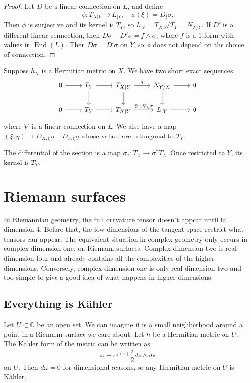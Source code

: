 \documentclass[10pt,a4paper]{article}
\newtheorem*{proof}{Proof}
\newcommand{\kk}[1]{\mathbb{#1}}
\DeclareMathOperator{\End}{End}
\begin{document}
\begin{proof}
Let $D$ be a linear connection on $L$, and define
\[
\phi : T_{X|Y} \to L_{|Y},
\quad
\phi(\xi) = D_\xi \sigma.
\]
Then $\phi$ is surjective and its kernel is $T_Y$, so $L_{|Y} = T_{X|Y} / T_Y = N_{X/Y}$. If $D'$ is a different linear connection, then $D\sigma - D'\sigma = f \wedge \sigma$, where $f$ is a $1$-form with values in $\End(L)$. Then $D\sigma = D'\sigma$ on $Y$, so $\phi$ does not depend on the choice of connection.
\end{proof}

Suppose $h_X$ is a Hermitian metric on $X$. We have two short exact sequences
\[
\begin{tikzcd}
0 \ar[r] & T_Y \ar[r]\ar[d] & T_{X|Y} \ar[d] \ar[r,"q"] & N_{Y/X} \ar[r] \ar[d] & 0
\\
0 \ar[r] & T_Y \ar[r] & T_{X|Y} \ar[r,"\xi \mapsto \nabla_\xi\sigma"] & L_{|Y} \ar[r] & 0
\end{tikzcd}
\]
where $\nabla$ is a linear connection on $L$. We also have a map $(\xi,\eta) \mapsto D_{X,\xi}\eta - D_{Y,\xi}\eta$ whose values are orthogonal to $T_Y$.

The differential of the section is a map $\sigma_* : T_X \to \sigma^* T_L$. Once restricted to $Y$, its kernel is $T_Y$.



\section{Riemann surfaces}
\label{sec:org776713b}

In Riemannian geometry, the full curvature tensor doesn't appear until in dimension $4$. Before that, the low dimensions of the tangent space restrict what tensors can appear. The equivalent situation in complex geometry only occurs in complex dimension one, on Riemann surfaces. Complex dimension two is real dimension four and already contains all the complexities of the higher dimensions. Conversely, complex dimension one is only real dimension two and too simple to give a good idea of what happens in higher dimensions.

\subsection{Everything is K\"ahler}
Let $U \subset \kk C$ be an open set. We can imagine it is a small neighborhood around a point in a Riemann surface we care about. Let $h$ be a Hermitian metric on $U$. The K\"ahler form of the metric can be written as
$$
\omega = e^{f(z)} \frac{i}{2} dz \wedge d\bar z
$$
on $U$. Then $d\omega = 0$ for dimensional reasons, so any Hermitian metric on $U$ is K\"ahler.
\end{document}

